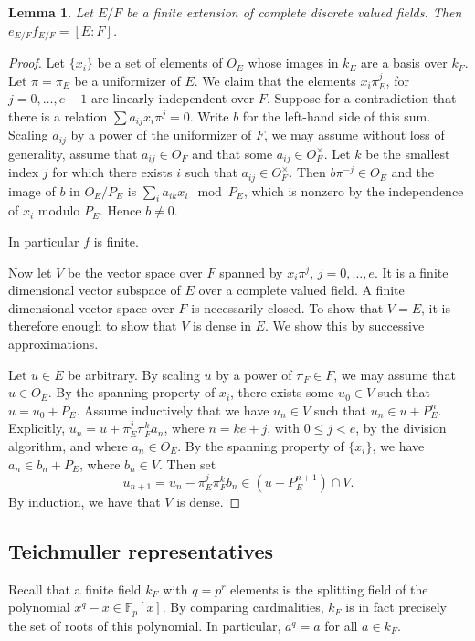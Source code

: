 \documentclass{amsart}
\newcommand{\ring}[1]{\mathbb{#1}}
\newtheorem{lemma}[equation]{Lemma}
\begin{document}
\begin{lemma} Let $E/F$ be a finite extension of complete discrete valued fields.
Then $e_{E/F} f_{E/F} = [E:F]$.
\end{lemma}

\begin{proof} Let $\{x_i\}$ be a set of elements of $O_E$ whose images
  in $k_E$ are a basis over $k_F$.  Let $\pi=\pi_E$ be a
  uniformizer of $E$.  We claim that the elements $x_i\pi^j_E$, for
  $j=0,\ldots,e-1$ are linearly independent over $F$.  Suppose for a
  contradiction that there is a relation $\sum a_{ij} x_i \pi^j=0$.
  Write $b$ for the left-hand side of this sum.  Scaling $a_{ij}$ by a
  power of the uniformizer of $F$, we may assume without loss of
  generality, assume that $a_{ij}\in O_F$ and that some $a_{ij}\in
  O_F^\times$.  Let $k$ be the smallest index $j$ for which there
  exists $i$ such that $a_{ij}\in O_F^\times$.  Then $b \pi^{-j} \in
  O_E$ and the image of $b$ in $O_E/P_E$ is $\sum_i a_{ik} x_i \mod
  P_E$, which is nonzero by the independence of $x_i$ modulo $P_E$.
  Hence $b\ne 0$.

  In particular $f$ is finite.  

  Now let $V$ be the vector space over $F$ spanned by $x_i\pi^j$, $j=0,\ldots, e$.
  It is a finite dimensional vector subspace of $E$
  over a complete valued field.  A finite dimensional vector space over $F$ is necessarily
  closed.  To show that $V=E$, it is therefore enough to show that $V$ is dense in $E$.
  We show this by successive approximations.

  Let $u\in E$ be arbitrary. By scaling $u$ by a power of $\pi_F\in
  F$, we may assume that $u\in O_E$.  By the spanning property of
  $x_i$, there exists some $u_0 \in V$ such that $u = u_0 + P_E$.
  Assume inductively that we have $u_n\in V$ such that $u_n \in u +
  P_E^n$.  Explicitly, $u_n = u + \pi_E^j\pi_F^k a_n$, where $n = k e +j$, with $0\le j<e$, 
  by the division
  algorithm, and where $a_n \in O_E$.  By the spanning property of $\{x_i\}$,
  we have $a_n \in b_n + P_E$, where $b_n\in V$.  Then set
  \[
  u_{n+1} = u_n - \pi_E^j\pi_F^k b_n \in (u + P_E^{n+1}) \cap V.
  \]
  By induction, we have that $V$ is dense.
\end{proof}

\subsection{Teichmuller representatives}

Recall that a finite field $k_F$ with $q=p^r$ elements is the splitting field of 
the polynomial $x^q-x\in \ring{F}_p[x]$.  By comparing cardinalities, $k_F$ is in fact
precisely the set of roots of this polynomial.  In particular, $a^q=a$ for all
$a\in k_F$.
\end{document}
